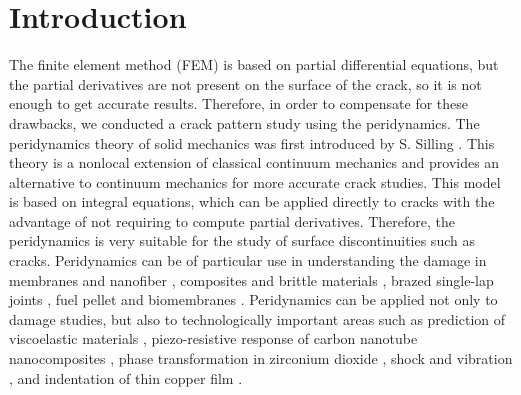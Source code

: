 \section{Introduction}
\label{sec:1}
The finite element method (FEM) is based on partial differential equations, but the partial derivatives are not present on the surface of the crack,
so it is not enough to get accurate results.
Therefore, in order to compensate for these drawbacks, we conducted a crack pattern study using the peridynamics.
The peridynamics theory of solid mechanics was first introduced by S. Silling \cite{Ref1,Ref2,Ref3,Ref4}.
This theory is a nonlocal extension of classical continuum mechanics and provides an alternative to continuum mechanics for more accurate crack studies.
This model is based on integral equations, which can be applied directly to cracks with the advantage of not requiring to compute partial derivatives.
Therefore, the peridynamics is very suitable for the study of surface discontinuities such as cracks.
Peridynamics can be of particular use in understanding the damage in membranes and nanofiber \cite{Ref5}, composites and brittle materials \cite{Ref6}, brazed single-lap joints \cite{Ref7}, fuel pellet \cite{Ref8} and biomembranes \cite{Ref9}.
Peridynamics can be applied not only to damage studies, but also to technologically important areas such as prediction of viscoelastic materials \cite{Ref10}, piezo-resistive response of carbon nanotube nanocomposites \cite{Ref11}, phase transformation in zirconium dioxide \cite{Ref12}, shock and vibration \cite{Ref13}, and indentation of thin copper film \cite{Ref14}.
